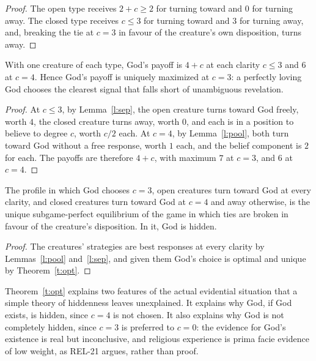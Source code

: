 \documentclass{situationist-preprint}
\begin{document}
\begin{proof}
The open type receives $2 + c \geq 2$ for turning toward and $0$ for turning away. The closed type receives $c \leq 3$ for turning toward and $3$ for turning away, and, breaking the tie at $c = 3$ in favour of the creature's own disposition, turns away.
\end{proof}

\begin{theorem}\label{t:opt}
With one creature of each type, God's payoff is $4 + c$ at each clarity $c \leq 3$ and $6$ at $c = 4$. Hence God's payoff is uniquely maximized at $c = 3$: a perfectly loving God chooses the clearest signal that falls short of unambiguous revelation.
\end{theorem}

\begin{proof}
At $c \leq 3$, by Lemma~\ref{l:sep}, the open creature turns toward God freely, worth $4$, the closed creature turns away, worth $0$, and each is in a position to believe to degree $c$, worth $c/2$ each. At $c = 4$, by Lemma~\ref{l:pool}, both turn toward God without a free response, worth $1$ each, and the belief component is $2$ for each. The payoffs are therefore $4 + c$, with maximum $7$ at $c = 3$, and $6$ at $c = 4$.
\end{proof}

\begin{corollary}[Equilibrium]\label{c:eq}
The profile in which God chooses $c = 3$, open creatures turn toward God at every clarity, and closed creatures turn toward God at $c = 4$ and away otherwise, is the unique subgame-perfect equilibrium of the game in which ties are broken in favour of the creature's disposition. In it, God is hidden.
\end{corollary}

\begin{proof}
The creatures' strategies are best responses at every clarity by Lemmas~\ref{l:pool} and~\ref{l:sep}, and given them God's choice is optimal and unique by Theorem~\ref{t:opt}.
\end{proof}

Theorem~\ref{t:opt} explains two features of the actual evidential situation that a simple theory of hiddenness leaves unexplained. It explains why God, if God exists, is hidden, since $c = 4$ is not chosen. It also explains why God is not completely hidden, since $c = 3$ is preferred to $c = 0$: the evidence for God's existence is real but inconclusive, and religious experience is prima facie evidence of low weight, as REL-21 argues, rather than proof.
\end{document}

